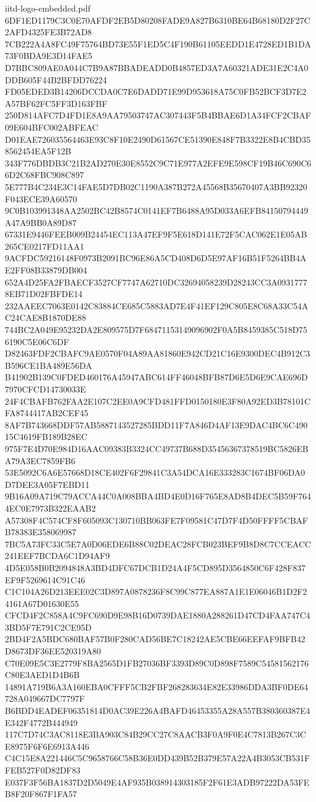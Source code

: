 \begin{filecontents*}[overwrite]{iitd-logo-embedded.pdf}
6DF1ED1179C3C0E70AFDF2EB5D80208FADE9A827B6310BE64B68180D2F27C2AFD4325FE3B72AD8
7CB222A4A8FC49F75764BD73E55F1ED5C4F190B61105EEDD1E4728ED1B1DA73F0BDA9E3D14FAE5
D7BBC809AE0A044C7B9A87BBADEADD0B4857ED3A7A60321ADE31E2C4A0DDB605F44B2BFDD76224
FD05EDED3B14206DCCDA0C7E6DADD71E99D953618A75C0FB52BCF3D7E2A57BF62FC5FF3D163FBF
250D814AFC7D4FD1E8A9AA79503747AC307443F5B4BBAE6D1A34FCF2CBAF09E604BFC002ABFEAC
D01EAE726035564463E93C8F10E2490D61567CE51390E848F7B3322E8B4CBD358562454EA5F12B
343F776DBDB3C21B2AD270E30E8552C9C71E977A2EFE9E598CF19B46C690C66D2C68FBC908C897
5E777B4C234E3C14FAE5D7DB02C1190A387B272A45568B35670407A3BB92320F043ECE39A60570
9C0B103991348AA2502BC42B8574C0141EF7B6488A95D033A6EFB84150794449A47A9BB0A89D87
67331E9446FEEB009B24454EC113A47EF9F5E618D141E72F5CAC062E1E05AB265CE0217FD11AA1
9ACFDC59216148F0973B2091BC96E86A5CD408D6D5E97AF16B51F5264BB4AE2FF08B33879DB004
652A4D25FA2FBAECF3527CF7747A62710DC32694058239D28243CC3A09317778EB71D02FBFDE14
232AAEEC7063E0142C83884CE685C5883AD7E4F41EF129C805E8C68A33C54AC24CAE8B1870DE88
744BC2A049E95232DA2E809575D7F68471153149096902F0A5B8459385C518D756190C5E06C6DF
D82463FDF2CBAFC9AE0570F04A89AA81860E942CD21C16E9300DEC4B912C3B596CE1BA489E56DA
B41902B139C0FDED460176A45947ABC614FF46048BFB87D6E5D6E9CAE696D7970CFCD14730033E
24F4CBAFB762FAA2E107C2EE0A9CFD481FFD0150180E3F80A92ED3B78101CFA8744417AB2CEF45
8AF7B743668DDF57AB5887143527285BDD11F7A846D4AF13E9DAC4BC6C49015C4619FB189B28EC
975F7E4D70E984D16AAC09383B3324CC49737B688D35456367378519BC5826EBA79A3EC7859FB6
53E5092C6A6E57668D18CE402F6F29841C3A54DCA16E333283C1674BF06DA0D7DEE3A05F7EBD11
9B16A09A719C79ACCA44C0A008BBA4BD4E0D16F765E8AD8B4DEC5B59F7644EC0E7973B322EAAB2
A57308F4C574CF8F605093C130710BB063FE7F09581C47D7F4D50FFFF5CBAFB78383E358069987
7BC5A73FC33C5E7A0D06EDE6B88C02DEAC28FCB023BEF9B8D8C7CCEACC241EEF7BCDA6C1D94AF9
4D5E058B0B2094848A3BD4DFC67DCB1D24A4F5CD895D3564850C6F428F837EF9F5269614C91C46
C1C104A26D213EEE02C3D897A0878236F8C99C877EA887A1E1E06046B1D2F24161A67D01630E55
CFCD4F2C858A4C9FC690D9E98B16D0739DAE1880A288261D47CD4FAA747C43BD5F7E791C2CE95D
2BD4F2A5BDC680BAF57B0F280CAD56BE7C18242AE5CBE66EEFAF9BFB42D8673DF36EE520319A80
C70E09E5C3E2779F8BA2565D1FB27036BF3393D89C0D898F7589C54581562176C80E3AED1D4B6B
14891A719B6A3A160EBA0CFFF5CB2FBF268283634E82E33986DDA3BF0DE64728A049667DC7797F
B6BDD4EADEF06351814D0AC39E226A4BAFD46453355A28A557B380360387E4E342F4772B444949
117C7D74C3AC8118E3BA903C84B29CC27C8AACB3F0A9F0E4C7813B267C3CE8975F6F6E6913A446
C4C15E8A221446C5C9658766C58B36E0DD439B52B379E57A22A4B3053CB531FFEB527F0D82DF83
E037F3F56BA1837D2D5049E4AF935B038914303185F2F61E3ADB97222DA53FEB8F20F867F1FA57

\end{filecontents*}
